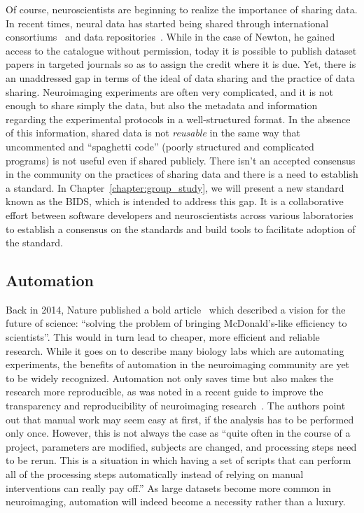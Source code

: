Of course, neuroscientists are beginning to realize the importance of sharing data. In recent times, neural data has started being shared through international consortiums~\citep{van2013wu, ollier2005uk} and data repositories~\citep{poldrack2013toward, gorgolewski2015neurovault}. While in the case of Newton, he gained access to the catalogue without permission, today it is possible to publish dataset papers in targeted journals so as to assign the credit where it is due. Yet, there is an unaddressed gap in terms of the ideal of data sharing and the practice of data sharing. Neuroimaging experiments are often very complicated, and it is not enough to share simply the data, but also the metadata and information regarding the experimental protocols in a well-structured format. 
In the absence of this information, shared data is not \emph{reusable} in the same way that uncommented and ``spaghetti code'' (poorly structured and complicated programs) is not useful even if shared publicly. There isn't an accepted consensus in the community on the practices of sharing data and there is a need to establish a standard. 
In Chapter~\ref{chapter:group_study}, we will present a new standard known as the \ac{BIDS}, which is intended to address this gap. 
It is a collaborative effort between software developers and neuroscientists across various laboratories to establish a consensus on the standards and build tools to facilitate adoption of the standard.

\subsection{Automation}
\label{sec:automation}

Back in 2014, Nature published a bold article~\citep{hayden2014automated} which described a vision for the future of science: ``solving the problem of bringing McDonald's-like efficiency to scientists''. This would in turn lead to cheaper, more efficient and reliable research. While it goes on to describe many biology labs which are automating experiments, the benefits of automation in the neuroimaging community are yet to be widely recognized. Automation not only saves time but also makes the research more reproducible, as was noted in a recent guide to improve the transparency and reproducibility of neuroimaging research~\citep{gorgolewski2016practical}. The authors point out that manual work may seem easy at first, if the analysis has to be performed only once. However, this is not always the case as ``quite often in the course of a project, parameters are modified, subjects are changed, and processing steps need to be rerun. This is a situation in which having a set of scripts that can perform all of the processing steps automatically instead of relying on manual interventions can really pay off.'' As large datasets become more common in neuroimaging, automation will indeed become a necessity rather than a luxury.

